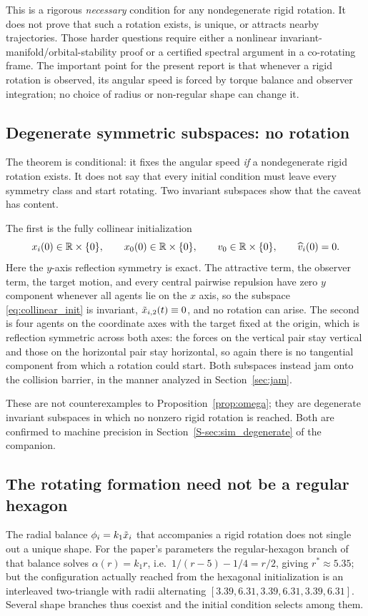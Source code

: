 This is a rigorous \emph{necessary} condition for any nondegenerate rigid rotation. It does not prove
that such a rotation exists, is unique, or attracts nearby trajectories. Those harder questions
require either a nonlinear invariant-manifold/orbital-stability proof or a certified spectral
argument in a co-rotating frame. The important point for the present report is that whenever a rigid
rotation is observed, its angular speed is forced by torque balance and observer integration; no
choice of radius or non-regular shape can change it.

\subsection{Degenerate symmetric subspaces: no rotation}
\label{sec:degenerate}
The theorem is conditional: it fixes the angular speed \emph{if} a nondegenerate rigid rotation
exists. It does not say that every initial condition must leave every symmetry class and start
rotating. Two invariant subspaces show that the caveat has content.

The first is the fully collinear initialization
\begin{equation}
  x_i(0)\in\mathbb{R}\times\{0\},
  \qquad x_0(0)\in\mathbb{R}\times\{0\},
  \qquad v_0\in\mathbb{R}\times\{0\},
  \qquad \widehat{v}_i(0)=0 .
  \label{eq:collinear_init}
\end{equation}
Here the $y$-axis reflection symmetry is exact. The attractive term, the observer term, the target
motion, and every central pairwise repulsion have zero $y$ component whenever all agents lie on the $x$
axis, so the subspace \eqref{eq:collinear_init} is invariant, $\tilde{x}_{i,2}(t)\equiv0$, and no rotation
can arise. The second is four agents on the coordinate axes with the target fixed at the origin, which
is reflection symmetric across both axes: the forces on the vertical pair stay vertical and those on
the horizontal pair stay horizontal, so again there is no tangential component from which a rotation
could start. Both subspaces instead jam onto the collision barrier, in the manner analyzed in
Section~\ref{sec:jam}.

These are not counterexamples to Proposition~\ref{prop:omega}; they are degenerate invariant subspaces
in which no nonzero rigid rotation is reached. Both are confirmed to machine precision in
Section~\ref{S-sec:sim_degenerate} of the companion.

\subsection{The rotating formation need not be a regular hexagon}
\label{sec:shapebranch}
The radial balance $\phi_i=k_1\tilde{x}_i$ that accompanies a rigid rotation does not single out a unique
shape. For the paper's parameters the regular-hexagon branch of that balance solves
$\alpha(r)=k_1r$, i.e.\ $1/(r-5)-1/4=r/2$, giving $r^*\approx5.35$; but the configuration actually
reached from the hexagonal initialization is an interleaved two-triangle with radii alternating
$[3.39,6.31,3.39,6.31,3.39,6.31]$. Several shape branches thus coexist and the initial condition
selects among them.


